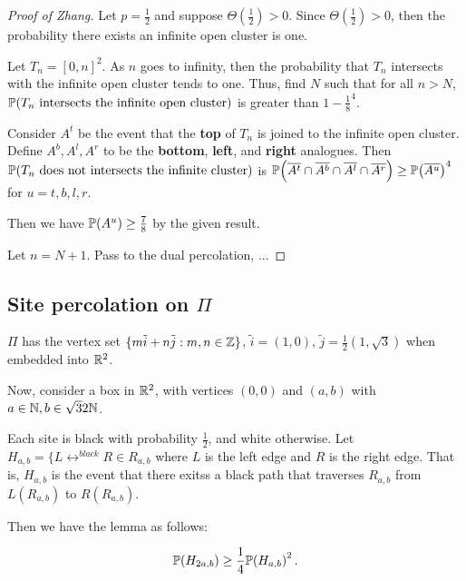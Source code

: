 \begin{proof}[Proof of Zhang]
  Let $p = \frac{1}{2}$ and suppose $\Theta(\frac{1}{2}) > 0$.  Since
  $\Theta(\frac{1}{2}) > 0$, then the probability there exists an
  infinite open cluster is one.

  Let $T_{n} = [0, n]^{2}$.  As $n$ goes to infinity, then the
  probability that $T_{n}$ intersects with the infinite open cluster
  tends to one. Thus, find $N$ such that for all $n > N$,
  $\Prob{\text{$T_n$ intersects the infinite open cluster}}$ is
  greater than $1 - \frac{1}{8}^4$.

  Consider $A^{t}$ be the event that the \textbf{top} of $T_{n}$ is joined to
  the infinite open cluster.  Define $A^{b}, A^{l}, A^{r}$ to be the
  \textbf{bottom}, \textbf{left}, and \textbf{right} analogues.  Then
  $\Prob{\text{$T_{n}$ does not intersects the infinite cluster}}$ is
  $\Prob{\overline{A^{t}} \cap \overline{A^{b}} \cap \overline{A^{l}} \cap
    \overline{A^{r}}} \geq \Prob{\overline{A^{u}}}^{4}$ for $u = t, b,
  l, r$.

  Then we have $\Prob{A^{u}} \geq \frac{7}{8}$ by the given result.

  Let $n = N + 1$.  Pass to the dual percolation, ...

\end{proof}

\subsection{Site percolation on $\Pi$}
\label{sec:site-percolation-pi}

$\Pi$ has the vertex set $\{ m \tilde i + n \tilde j: m, n \in \mathbb{Z}\}$,
$\tilde i = (1, 0)$, $\tilde j = \frac{1}{2}(1, \sqrt{3})$ when
embedded into $\mathbb{R}^{2}$.

Now, consider a box in $\mathbb{R}^{2}$, with vertices $(0, 0)$ and $(a, b)$
with $a \in \mathbb{N}, b \in \sqrt{3}{2} \mathbb{N}$.

Each site is black with probability $\frac{1}{2}$, and white
otherwise.  Let $H_{a, b} = \{ L \leftrightarrow^{black} R \in R_{a,
  b}$ where $L$ is the left edge and $R$ is the right edge.  That is,
$H_{a, b}$ is the event that there exitss a black path that traverses
$R_{a, b}$ from $L(R_{a, b})$ to $R(R_{a, b})$.

Then we have the lemma as follows:

\begin{lem}
  \begin{align}
    \label{eq:40}
    \Prob{H_{2a, b}} \geq \frac{1}{4} \Prob{H_{a, b}}^{2}.
  \end{align}
\end{lem}

